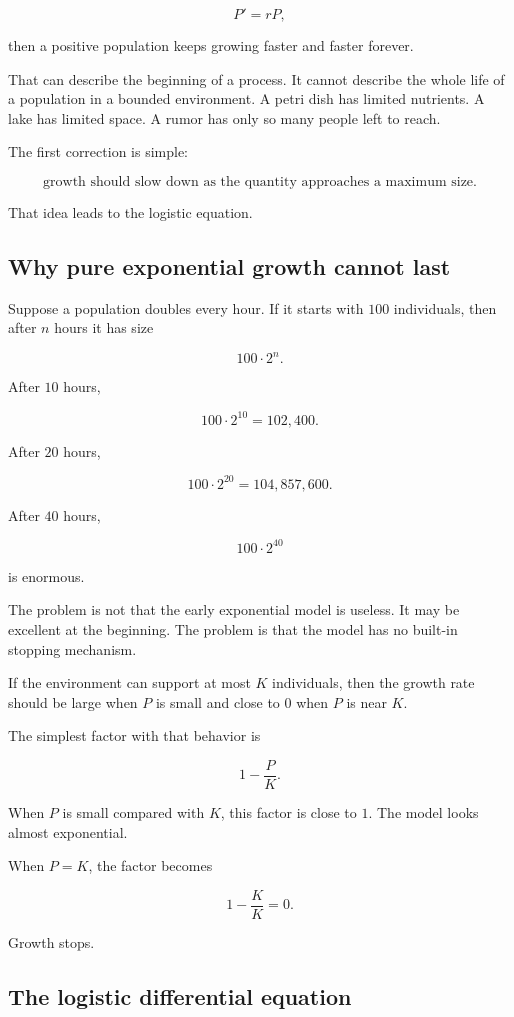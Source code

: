 \[
P'=rP,
\]

then a positive population keeps growing faster and faster forever.

That can describe the beginning of a process.  It cannot describe the whole life of a
population in a bounded environment.  A petri dish has limited nutrients.  A lake has
limited space.  A rumor has only so many people left to reach.

The first correction is simple:

\[
\text{growth should slow down as the quantity approaches a maximum size.}
\]

That idea leads to the logistic equation.

\subsection{Why pure exponential growth cannot last}
\label{subsec:why-exponential-growth-cannot-last}

Suppose a population doubles every hour.  If it starts with \(100\) individuals, then
after \(n\) hours it has size

\[
100\cdot2^n.
\]

After \(10\) hours,

\[
100\cdot2^{10}=102{,}400.
\]

After \(20\) hours,

\[
100\cdot2^{20}=104{,}857{,}600.
\]

After \(40\) hours,

\[
100\cdot2^{40}
\]

is enormous.

The problem is not that the early exponential model is useless.  It may be excellent
at the beginning.  The problem is that the model has no built-in stopping mechanism.

If the environment can support at most \(K\) individuals, then the growth rate should
be large when \(P\) is small and close to \(0\) when \(P\) is near \(K\).

The simplest factor with that behavior is

\[
1-\frac{P}{K}.
\]

When \(P\) is small compared with \(K\), this factor is close to \(1\).  The model looks
almost exponential.

When \(P=K\), the factor becomes

\[
1-\frac{K}{K}=0.
\]

Growth stops.

\subsection{The logistic differential equation}
\label{subsec:logistic-differential-equation}

